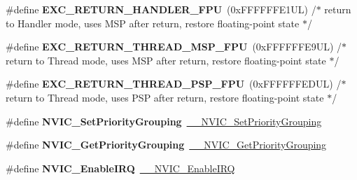 \begin{DoxyCompactItemize}
\#define {\bfseries E\+X\+C\+\_\+\+R\+E\+T\+U\+R\+N\+\_\+\+H\+A\+N\+D\+L\+E\+R\+\_\+\+F\+PU}~(0x\+F\+F\+F\+F\+F\+F\+E1\+U\+L)     /$\ast$ return to Handler mode, uses M\+S\+P after return, restore floating-\/point state $\ast$/
\item 
\mbox{\label{group___c_m_s_i_s___core___n_v_i_c_functions_gaad4cb3b34fd4264ccfae1fbbc75a3431}} 
\#define {\bfseries E\+X\+C\+\_\+\+R\+E\+T\+U\+R\+N\+\_\+\+T\+H\+R\+E\+A\+D\+\_\+\+M\+S\+P\+\_\+\+F\+PU}~(0x\+F\+F\+F\+F\+F\+F\+E9\+U\+L)     /$\ast$ return to Thread mode, uses M\+S\+P after return, restore floating-\/point state  $\ast$/
\item 
\mbox{\label{group___c_m_s_i_s___core___n_v_i_c_functions_gadd2299e1d3a79c90b610c6b6f4cadb95}} 
\#define {\bfseries E\+X\+C\+\_\+\+R\+E\+T\+U\+R\+N\+\_\+\+T\+H\+R\+E\+A\+D\+\_\+\+P\+S\+P\+\_\+\+F\+PU}~(0x\+F\+F\+F\+F\+F\+F\+E\+D\+U\+L)     /$\ast$ return to Thread mode, uses P\+S\+P after return, restore floating-\/point state  $\ast$/
\item 
\mbox{\label{group___c_m_s_i_s___core___n_v_i_c_functions_ga0e798d5aec68cdd8263db86a76df788f}} 
\#define {\bfseries N\+V\+I\+C\+\_\+\+Set\+Priority\+Grouping}~\hyperlink{group___c_m_s_i_s___core___n_v_i_c_functions_gafc94dcbaee03e4746ade1f5bb9aaa56d}{\+\_\+\+\_\+\+N\+V\+I\+C\+\_\+\+Set\+Priority\+Grouping}
\item 
\mbox{\label{group___c_m_s_i_s___core___n_v_i_c_functions_ga4eeb9214f2264fc23c34ad5de2d3fa11}} 
\#define {\bfseries N\+V\+I\+C\+\_\+\+Get\+Priority\+Grouping}~\hyperlink{group___c_m_s_i_s___core___n_v_i_c_functions_ga9b894af672df4373eb637f8288845c05}{\+\_\+\+\_\+\+N\+V\+I\+C\+\_\+\+Get\+Priority\+Grouping}
\item 
\mbox{\label{group___c_m_s_i_s___core___n_v_i_c_functions_ga57b3064413dbc7459d9646020fdd8bef}} 
\#define {\bfseries N\+V\+I\+C\+\_\+\+Enable\+I\+RQ}~\hyperlink{group___c_m_s_i_s___core___n_v_i_c_functions_ga71227e1376cde11eda03fcb62f1b33ea}{\+\_\+\+\_\+\+N\+V\+I\+C\+\_\+\+Enable\+I\+RQ}
\item 
\mbox{\label{group___c_m_s_i_s___core___n_v_i_c_functions_ga857de13232ec65dd15087eaa15bc4a69}} 

\end{DoxyCompactItemize}
